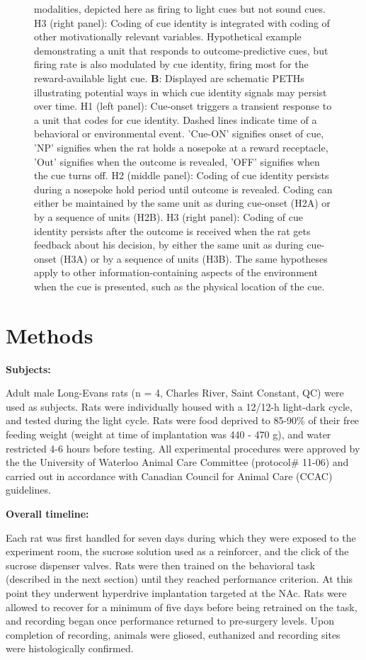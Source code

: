 \documentclass[11pt]{article}
\newcommand{\bsf}[1]{\textbf{#1}}
\begin{document}
\begin{figure}[h]
{  modalities, depicted here as firing to light cues but not sound
  cues. H3 (right panel): Coding of cue identity is integrated with
  coding of other motivationally relevant variables. Hypothetical
  example demonstrating a unit that responds to outcome-predictive
  cues, but firing rate is also modulated by cue identity, firing most
  for the reward-available light cue. \bsf{B}: Displayed are schematic
  PETHs illustrating potential ways in which cue identity signals may
  persist over time. H1 (left panel): Cue-onset triggers a transient
  response to a unit that codes for cue identity. Dashed lines
  indicate time of a behavioral or environmental event. 'Cue-ON'
  signifies onset of cue, 'NP' signifies when the rat holds a nosepoke
  at a reward receptacle, 'Out' signifies when the outcome is
  revealed, 'OFF' signifies when the cue turns off. H2 (middle
  panel): Coding of cue identity persists during a nosepoke hold
  period until outcome is revealed. Coding can either be maintained by
  the same unit as during cue-onset (H2A) or by a sequence of units
  (H2B). H3 (right panel): Coding of cue identity persists after the outcome is received when the rat gets feedback about his decision,
  by either the same unit as during cue-onset (H3A) or by a sequence of units (H3B). The
  same hypotheses apply to other information-containing aspects of the
  environment when the cue is presented, such as the physical location
  of the cue.}
\label{fig:schematic}
\end{figure}

\section*{Methods}

{\bf Subjects:}

Adult male Long-Evans rats (n = 4, Charles River, Saint Constant, QC)
were used as subjects. Rats were individually housed with a 12/12-h
light-dark cycle, and tested during the light cycle. Rats were food
deprived to 85-90\% of their free feeding weight (weight at time of
implantation was 440 - 470 g), and water restricted 4-6 hours before
testing. All experimental procedures were approved by the the
University of Waterloo Animal Care Committee (protocol\# 11-06) and
carried out in accordance with Canadian Council for Animal Care (CCAC)
guidelines.

{\bf Overall timeline:}

Each rat was first handled for seven days during which they were
exposed to the experiment room, the sucrose solution used as a
reinforcer, and the click of the sucrose dispenser valves. Rats were
then trained on the behavioral task (described in the next section)
until they reached performance criterion. At this point they
underwent hyperdrive implantation targeted at the NAc. Rats were
allowed to recover for a minimum of five days before being retrained
on the task, and recording began once performance returned to
pre-surgery levels. Upon completion of recording, animals were gliosed,
euthanized and recording sites were histologically confirmed.
\end{document}
